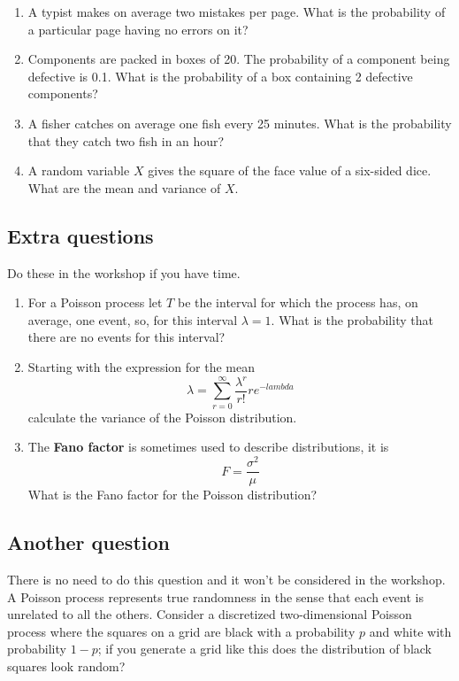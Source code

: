 \documentclass[11pt,a4paper]{scrartcl}
\begin{document}
\begin{enumerate}

  

\item A typist makes on average two mistakes per page. What is the probability of a particular page having no errors on it?

\item Components are packed in boxes of 20. The probability of a component being defective is 0.1. What is the probability of a box containing 2 defective components?
  
\item A fisher catches on average one fish every 25 minutes. What is
  the probability that they catch two fish in an hour?

 \item A random variable $X$ gives the square of the face value of a six-sided dice. What are the mean and variance of $X$.

\end{enumerate}

\subsection*{Extra questions}
Do these in the workshop if you have time.


\begin{enumerate}

\item For a Poisson process let $T$ be the interval for which the
process has, on average, one event, so, for this interval $\lambda=1$. What is the probability that there are no events for this interval?  

\item Starting with the expression for the mean
  \begin{equation}
    \lambda =\sum_{r=0}^\infty \frac{\lambda^r}{r!}re^{-lambda}
  \end{equation}
  calculate the variance of the Poisson distribution.
  
\item The \textbf{Fano factor} is sometimes used to describe distributions, it is
  \begin{equation}
    F=\frac{\sigma^2}{\mu}
  \end{equation}
What is the Fano factor for the Poisson distribution?

\end{enumerate}

\subsection*{Another question}

There is no need to do this question and it won't be considered in the
workshop. A Poisson process represents true randomness in the sense
that each event is unrelated to all the others. Consider a discretized
two-dimensional Poisson process where the squares on a grid are black
with a probability $p$ and white with probability $1-p$; if you
generate a grid like this does the distribution of black squares look
random?
\end{document}
